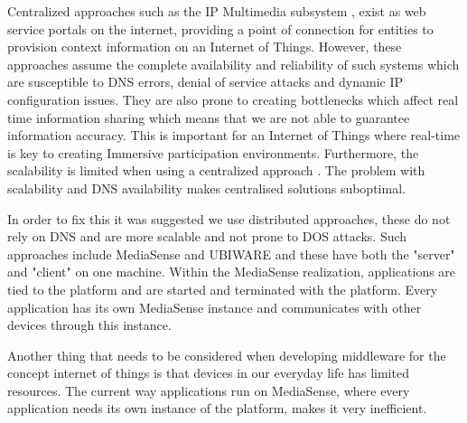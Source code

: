 Centralized approaches such as the IP Multimedia subsystem \cite{Kardeby:2010:UMF:1845879.1846331}, exist as web service portals on the internet, providing a point of connection for entities to provision context information on an Internet of Things. However, these approaches assume the complete availability and reliability of such systems which are susceptible to DNS errors, denial of service attacks and dynamic IP configuration issues. They are also prone to creating bottlenecks which affect real time information sharing which means that we are not able to guarantee information accuracy. This is important for an Internet of Things where real-time is key to creating Immersive participation environments. Furthermore, the scalability is limited when using a centralized approach \cite{Kanter539187}. The problem with scalability and DNS availability makes centralised solutions suboptimal.

In order to fix this it was suggested we use distributed approaches, these do not rely on DNS and are more scalable and not prone to DOS attacks. Such approaches include MediaSense \cite{Kanter539187} and UBIWARE \cite{osterle2010memorandum} and these have both the "server" and "client" on one machine. Within the MediaSense realization, applications are tied to the platform and are started and terminated with the platform. Every application has its own MediaSense instance and communicates with other devices through this instance.

Another thing that needs to be considered when developing middleware for the concept internet of things is that devices in our everyday life has limited resources. The current way applications run on MediaSense, where every application needs its own instance of the platform, makes it very inefficient.
